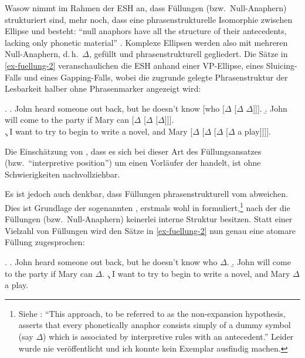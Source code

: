 Wasow nimmt im Rahmen der ESH an, dass Füllungen (bzw.\ Null-Anaphern) strukturiert sind, mehr noch, dass eine phrasenstrukturelle Isomorphie zwischen Ellipse und  besteht: "`null anaphors have all the structure of their antecedents, lacking only phonetic material"' \citep[98]{Wasow:72}. Komplexe Ellipsen werden also mit mehreren Null-Anaphern, d.\,h.\ $\Delta$, gefüllt und phrasenstrukturell gegliedert. Die Sätze in \ref{ex-fuellung-2} veranschaulichen die ESH anhand einer VP-Ellipse, eines Sluicing-Falls und eines Gapping-Falls, wobei die zugrunde gelegte Phrasenstruktur der Lesbarkeit halber ohne Phrasenmarker angezeigt wird:

\largerpage%

\ex. \label{ex-fuellung-2}
\a. John heard someone out back, but he doesn't know [who [$\Delta$ [$\Delta$ $\Delta$]]]. %
\b. John will come to the party if Mary can [$\Delta$ [$\Delta$ [$\Delta$]]].\\
\citep[(31)]{Wasow:72}
\c. I want to try to begin to write a novel, and Mary [$\Delta$ [$\Delta$ [$\Delta$ [$\Delta$  a play]]]].\label{ex-fuellung-2-c}

Die Einschätzung von \citet[6]{Winkler:Schwabe:03}, dass es sich bei dieser Art des Füllungsansatzes (bzw.\ "`interpretive position"') um einen Vorläufer der  handelt, ist ohne Schwierigkeiten nachvollziehbar. 
 
Es ist jedoch auch denkbar, dass Füllungen phrasenstrukturell vom  abweichen. Dies ist Grundlage der sogenannten , erstmals wohl in \cite{Akmajian:68} formuliert,\footnote{Siehe \citet[94]{Wasow:72}: "`This approach, to be referred to as the non-expansion hypothesis, asserts that every phonetically anaphor consists simply of a dummy symbol (say $\Delta$) which is associated by interpretive rules with an antecedent."' Leider wurde \cite{Akmajian:68} nie veröffentlicht und ich konnte kein Exemplar ausfindig machen.} nach der die Füllungen (bzw.\ Null-Anaphern) keinerlei interne Struktur besitzen. Statt einer Vielzahl von Füllungen wird den Sätze in \ref{ex-fuellung-2} nun genau eine atomare Füllung zugesprochen: 

\ex. \label{ex-fuellung-3}
\a. \label{ex-fuellung-3-a}John heard someone out back, but he doesn't know who $\Delta$.
\b. \label{ex-fuellung-3-b}John will come to the party if Mary can $\Delta$.
\c. \label{ex-fuellung-3-c}I want to try to begin to write a novel, and Mary $\Delta$ a play.

